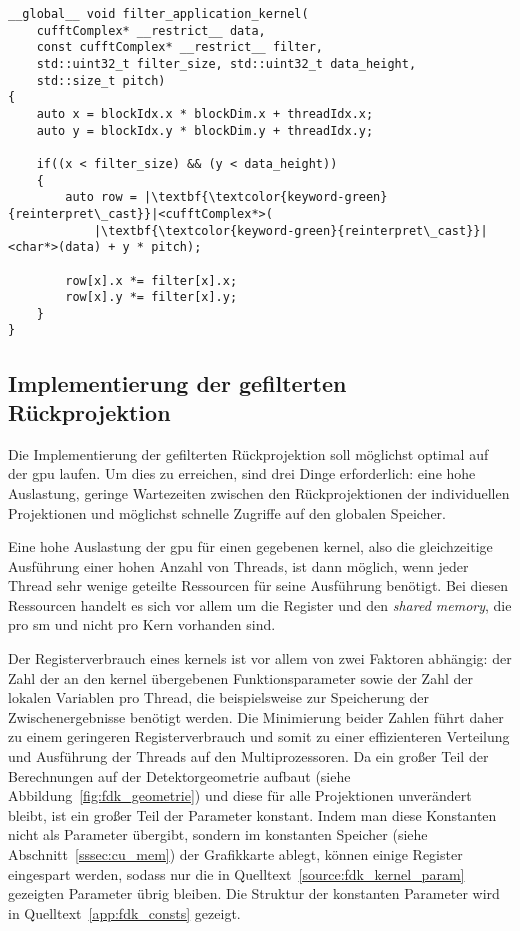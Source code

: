 \begin{code}
\begin{verbatim}
__global__ void filter_application_kernel(
    cufftComplex* __restrict__ data,
    const cufftComplex* __restrict__ filter,
    std::uint32_t filter_size, std::uint32_t data_height,
    std::size_t pitch)
{
    auto x = blockIdx.x * blockDim.x + threadIdx.x;
    auto y = blockIdx.y * blockDim.y + threadIdx.y;

    if((x < filter_size) && (y < data_height))
    {
        auto row = |\textbf{\textcolor{keyword-green}{reinterpret\_cast}}|<cufftComplex*>(
            |\textbf{\textcolor{keyword-green}{reinterpret\_cast}}|<char*>(data) + y * pitch);

        row[x].x *= filter[x].x;
        row[x].y *= filter[x].y;
    }
}
\end{verbatim}
\label{source:impl_filter}
\end{code}

\subsection{Implementierung der gefilterten Rückprojektion}

Die Implementierung der gefilterten Rückprojektion soll möglichst optimal auf der \gls{gpu} laufen. Um dies zu
erreichen, sind drei Dinge erforderlich: eine hohe Auslastung, geringe Wartezeiten zwischen den Rückprojektionen
der individuellen Projektionen und möglichst schnelle Zugriffe auf den globalen Speicher.

Eine hohe Auslastung der \gls{gpu} für einen gegebenen \gls{kernel}, also die gleichzeitige Ausführung einer hohen
Anzahl von Threads, ist dann möglich, wenn jeder Thread sehr wenige geteilte Ressourcen für seine Ausführung benötigt.
Bei diesen Ressourcen handelt es sich vor allem um die Register und den \textit{shared memory}, die pro \gls{sm} und
nicht pro Kern vorhanden sind.

Der Registerverbrauch eines \gls{kernel}s ist vor allem von zwei Faktoren abhängig: der Zahl der an den \gls{kernel}
übergebenen Funktionsparameter sowie der Zahl der lokalen Variablen pro Thread, die beispielsweise zur Speicherung der
Zwischenergebnisse benötigt werden. Die Minimierung beider Zahlen führt daher zu einem geringeren Registerverbrauch und
somit zu einer effizienteren Verteilung und Ausführung der Threads auf den Multiprozessoren. Da ein großer Teil der
Berechnungen auf der Detektorgeometrie aufbaut (siehe Abbildung~\ref{fig:fdk_geometrie}) und diese für alle Projektionen
unverändert bleibt, ist ein großer Teil der Parameter konstant. Indem man diese Konstanten nicht als Parameter übergibt,
sondern im konstanten Speicher (siehe Abschnitt~\ref{sssec:cu_mem}) der Grafikkarte ablegt, können einige Register
eingespart werden, sodass nur die in Quelltext~\ref{source:fdk_kernel_param} gezeigten Parameter übrig bleiben. Die
Struktur der konstanten Parameter wird in Quelltext~\ref{app:fdk_consts} gezeigt.

